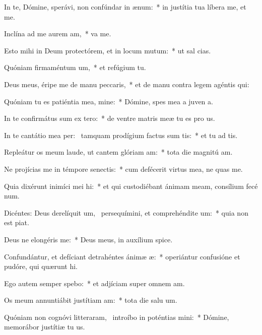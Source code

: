 \item In te, Dómine, sperávi, non confúndar in ænum:~* in justítia tua líbera me, et  me.
\item Inclína ad me aurem am,~*  va me.
\item Esto mihi in Deum protectórem, et in locum mutum:~* ut sal  cias.
\item Quóniam firmaméntum um,~* et refúgium   tu.
\item Deus meus, éripe me de manu peccaris,~* et de manu contra legem agéntis  qui:
\item Quóniam tu es patiéntia mea, mine:~* Dómine, spes mea a juven a.
\item In te confirmátus sum ex tero:~* de ventre matris meæ tu es pro us.
\item In te cantátio mea per:~\pscross{} tamquam prodígium factus sum tis:~* et tu ad tis.
\item Repleátur os meum laude, ut cantem glóriam am:~* tota die magnitú am.
\item Ne projícias me in témpore senectis:~* cum defécerit virtus mea, ne quas me.
\item Quia dixérunt inimíci mei hi:~* et qui custodiébant ánimam meam, consílium fecé  num.
\item Dicéntes: Deus derelíquit um,~\pscross{} persequímini, et comprehéndite um:~* quia non est  piat.
\item Deus ne elongéris  me:~* Deus meus, in auxílium  spice.
\item Confundántur, et defíciant detrahéntes ánimæ æ:~* operiántur confusióne et pudóre, qui quærunt  hi.
\item Ego autem semper spebo:~* et adjíciam super omnem  am.
\item Os meum annuntiábit justítiam am:~* tota die salu um.
\item Quóniam non cognóvi litteraram,~\pscross{} introíbo in poténtias mini:~* Dómine, memorábor justítiæ tu us.
